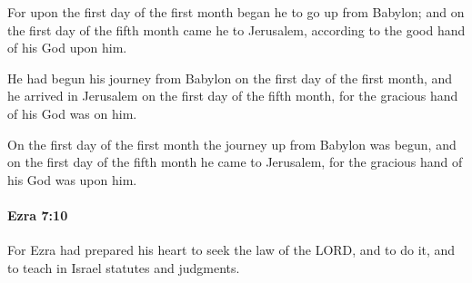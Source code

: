 			\begin{versebox}
					\item[BHS] 
					\item[LXX] 
					\item[ASV] For upon the first day of the first month began he to go up from Babylon; and on the first day of the fifth month came he to Jerusalem, according to the good hand of his God upon him.
					\item[NIV] He had begun his journey from Babylon on the first day of the first month, and he arrived in Jerusalem on the first day of the fifth month, for the gracious hand of his God was on him.
					\item[NRSV] On the first day of the first month the journey up from Babylon was begun, and on the first day of the fifth month he came to Jerusalem, for the gracious hand of his God was upon him.
			\end{versebox}

		\paragraph{Ezra 7:10} %
			\label{EZRA-7-10}

			For Ezra had prepared his heart to seek the law of the LORD, and to do it, and to teach in Israel statutes and judgments.

